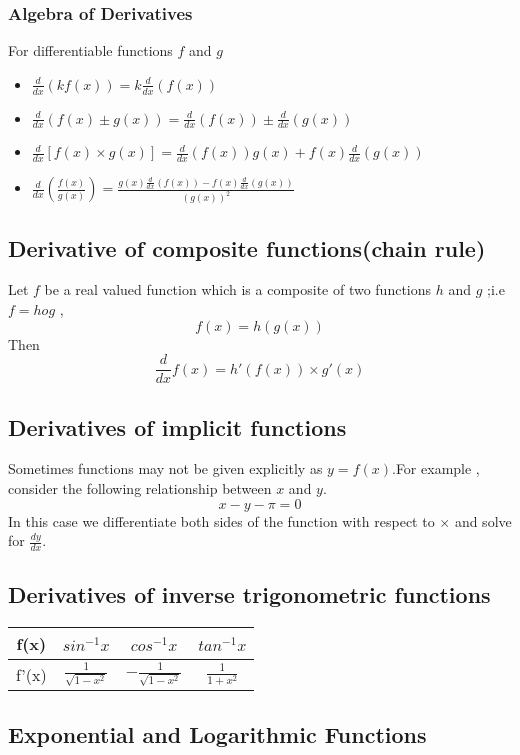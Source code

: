 \documentclass[12pt]{article}
\begin{document}
\begin{multicols*}{2}
\subsubsection*{Algebra of Derivatives}
For differentiable functions $f$ and $g$
\begin{itemize}
    \item $\frac{d}{dx}(k f(x))=k \frac{d}{dx}(f(x))$
    \item $\frac{d}{dx}(f(x) \pm g(x))= \frac{d}{dx}(f(x)) \pm \frac{d}{dx}(g(x))$
    \item $\frac{d}{dx}[f(x) \times g(x)]= \frac{d}{dx}(f(x)) g(x)+f(x) \frac{d}{dx}(g(x))$
    \item $\frac{d}{dx}(\frac{f(x)}{g(x)})=\frac{g(x)\frac{d}{dx}(f(x))-f(x) \frac{d}{dx}(g(x))}{(g(x))^2}$
    
\end{itemize}

\subsection*{Derivative of composite functions(chain rule)}

Let $f$ be a real valued function which is a composite of two
functions $h$ and $g$ ;i.e $f=hog$ ,$$f(x)=h(g(x))$$
Then $$\frac{d}{dx}f(x)=h'(f(x)) \times g'(x)$$

\subsection*{Derivatives of implicit functions}
Sometimes functions may not be given explicitly as $y=f(x)$.For example , consider the following relationship between $x$ and $y$.
$$x-y-\pi=0$$ 
In this case we differentiate both sides of the function with respect to $×$ and solve for $\frac{dy}{dx}.$


\subsection*{Derivatives of inverse trigonometric functions}
\begin{tabular}{ | c |c | c | c | } 
    \hline
    f(x)& $sin^{-1}x$ & $cos^{-1}x$ & $tan^{-1}x$\\ 
    \hline
    f'(x)& $\frac{1}{\sqrt{1-x^2}}$ & $-\frac{1}{\sqrt{1-x^2}}$  & $\frac{1}{1+x^2}$\\ 
    \hline

  \end{tabular}
  \subsection*{Exponential and Logarithmic Functions}


\end{multicols*}
\end{document}
